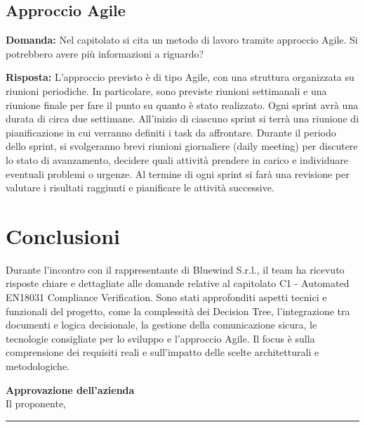 \documentclass[a4paper,12pt]{article}
\begin{document}
{    \subsection{Approccio Agile}
    \textbf{Domanda:} Nel capitolato si cita un metodo di lavoro tramite approccio Agile. Si potrebbero avere più informazioni a riguardo?

    \textbf{Risposta:} L'approccio previsto è di tipo Agile, con una struttura organizzata su riunioni periodiche. In particolare, sono previste riunioni settimanali e una riunione finale per fare il punto su quanto è stato realizzato. Ogni sprint avrà una durata di circa due settimane. All'inizio di ciascuno sprint si terrà una riunione di pianificazione in cui verranno definiti i task da affrontare. Durante il periodo dello sprint, si svolgeranno brevi riunioni giornaliere (daily meeting) per discutere lo stato di avanzamento, decidere quali attività prendere in carico e individuare eventuali problemi o urgenze. Al termine di ogni sprint si farà una revisione per valutare i risultati raggiunti e pianificare le attività successive.

}
\newpage

\section{Conclusioni}{
  Durante l'incontro con il rappresentante di Bluewind S.r.l., il team ha ricevuto risposte chiare e dettagliate alle domande relative al capitolato C1 - Automated EN18031 Compliance Verification.
  Sono stati approfonditi aspetti tecnici e funzionali del progetto, come la complessità dei Decision Tree, l'integrazione tra documenti e logica decisionale, la gestione della comunicazione sicura, le tecnologie consigliate per lo sviluppo e l'approccio Agile. Il focus è sulla comprensione dei requisiti reali e sull'impatto delle scelte architetturali e metodologiche.
}

\vspace{2cm}
\begin{flushright}
    \textbf{Approvazione dell'azienda} \\
    Il proponente,\\[0.5cm]
    \rule{6cm}{0.4pt}\\
\end{flushright}
\end{document}
